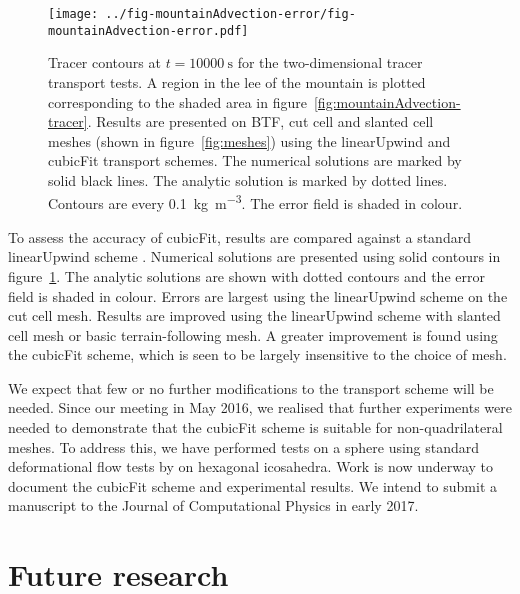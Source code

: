 \documentclass[a4paper,11pt]{article}
\begin{document}
\begin{figure}
	\centering
	\texttt{[image: ../fig-mountainAdvection-error/fig-mountainAdvection-error.pdf]}
	\caption{Tracer contours at $t=\SI{10000}{\second}$ for the two-dimensional tracer transport tests.  A region in the lee of the mountain is plotted corresponding to the shaded area in figure~\ref{fig:mountainAdvection-tracer}.  Results are presented on BTF, cut cell and slanted cell meshes (shown in figure~\ref{fig:meshes}) using the linearUpwind and cubicFit transport schemes.  The numerical solutions are marked by solid black lines.  The analytic solution is marked by dotted lines.  Contours are every \SI{0.1}{\kilo\gram\per\meter\cubed}.  The error field is shaded in colour.}
	\label{fig:mountainAdvection-errors}
\end{figure}

To assess the accuracy of cubicFit, results are compared against a standard linearUpwind scheme .  Numerical solutions are presented using solid contours in figure~\ref{fig:mountainAdvection-errors}.  The analytic solutions are shown with dotted contours and the error field is shaded in colour.
Errors are largest using the linearUpwind scheme on the cut cell mesh.  Results are improved using the linearUpwind scheme with slanted cell mesh or basic terrain-following mesh.  A greater improvement is found using the cubicFit scheme, which is seen to be largely insensitive to the choice of mesh.

We expect that few or no further modifications to the transport scheme will be needed.   Since our meeting in May 2016, we realised that further experiments were needed to demonstrate that the cubicFit scheme is suitable for non-quadrilateral meshes.  To address this, we have performed tests on a sphere using standard deformational flow tests by \citet{lauritzen2012} on hexagonal icosahedra.
Work is now underway to document the cubicFit scheme and experimental results.
We intend to submit a manuscript to the Journal of Computational Physics in early 2017.

\section{Future research}
\label{sec:future}
\end{document}
